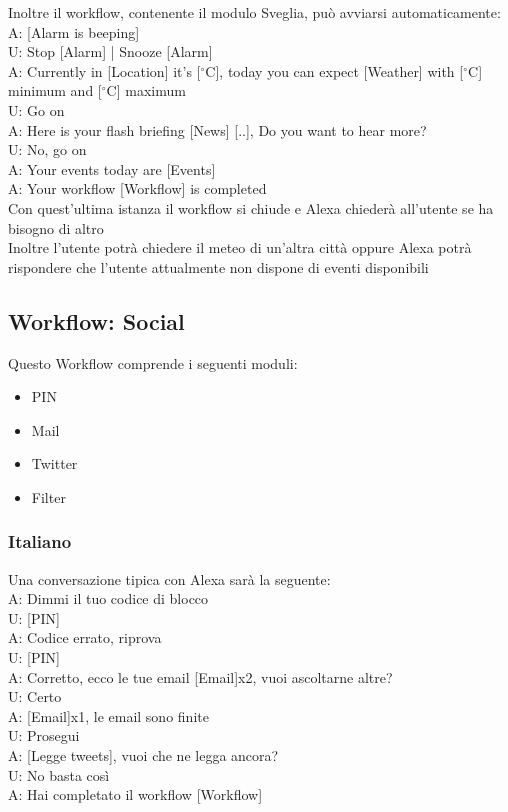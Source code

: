 Inoltre il workflow, contenente il modulo Sveglia, può avviarsi automaticamente:\\
A: [Alarm is beeping]\\
U: Stop [Alarm] | Snooze [Alarm]\\
A: Currently in [Location] it's [$^\circ$C], today you can expect [Weather] with [$^\circ$C] minimum and [$^\circ$C] maximum\\
U: Go on\\
A: Here is your flash briefing [News] [..], Do you want to hear more?\\
U: No, go on\\
A: Your events today are [Events]\\
A: Your workflow [Workflow] is completed\\

Con quest'ultima istanza il workflow si chiude e Alexa chiederà all'utente se ha bisogno di altro\\
Inoltre l'utente potrà chiedere il meteo di un'altra città oppure Alexa potrà rispondere che l'utente attualmente non dispone di eventi disponibili

\subsection{Workflow: Social}
Questo Workflow comprende i seguenti moduli:
\begin{itemize}
	\item PIN
	\item Mail
	\item Twitter
	\item Filter
\end{itemize}
\subsubsection{Italiano}
Una conversazione tipica con Alexa sarà la seguente: \\
A: Dimmi il tuo codice di blocco \\
U: [PIN] \\
A: Codice errato, riprova \\
U: [PIN] \\
A: Corretto, ecco le tue email [Email]x2, vuoi ascoltarne altre?\\
U: Certo\\
A: [Email]x1, le email sono finite\\
U: Prosegui\\
A: [Legge tweets], vuoi che ne legga ancora?\\
U: No basta così\\
A: Hai completato il workflow [Workflow]

